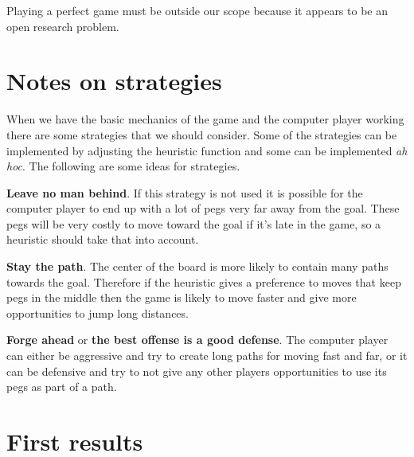 \documentclass[a4paper,11pt]{article}
\begin{document}
Playing a perfect game must be outside our scope because it appears to
be an open research problem.

\section{Notes on strategies}

When we have the basic mechanics of the game and the computer player
working there are some strategies that we should consider. Some of the
strategies can be implemented by adjusting the heuristic function and
some can be implemented \emph{ah hoc}. The following are some ideas
for strategies.

\textbf{Leave no man behind}. If this strategy is not used it is
possible for the computer player to end up with a lot of pegs very far
away from the goal. These pegs will be very costly to move toward the
goal if it's late in the game, so a heuristic should take that into
account.

\textbf{Stay the path}. The center of the board is more likely to
contain many paths towards the goal. Therefore if the heuristic gives
a preference to moves that keep pegs in the middle then the game is
likely to move faster and give more opportunities to jump long
distances.

\textbf{Forge ahead} or \textbf{the best offense is a good defense}.
The computer player can either be aggressive and try to create long
paths for moving fast and far, or it can be defensive and try to not
give any other players opportunities to use its pegs as part of a
path.

\section{First results}

\end{document}
